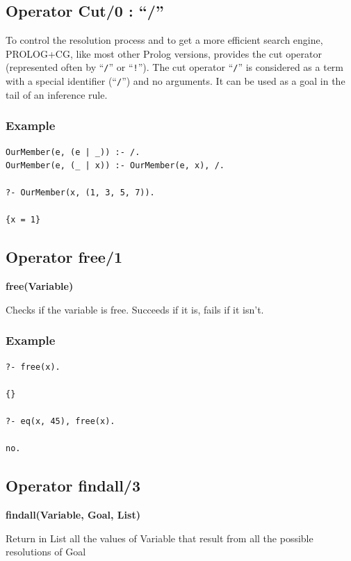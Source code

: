 \documentclass{book}
\begin{document}
\subsection{Operator Cut/0 : ``/''}

To control the resolution process and to get a more efficient search
engine, PROLOG+CG, like most other Prolog versions, provides the cut
operator (represented often by ``\texttt{/}'' or
``\texttt{!}''). The cut operator ``\texttt{/}'' is considered
as a term with a special identifier (``\texttt{/}'') and no
arguments. It can be used as a goal in the tail of an inference rule.

\subsubsection{Example}

\begin{verbatim}
OurMember(e, (e | _)) :- /.
OurMember(e, (_ | x)) :- OurMember(e, x), /.

?- OurMember(x, (1, 3, 5, 7)).

{x = 1}
\end{verbatim}



\subsection{Operator free/1}

{\bf free(Variable)}

Checks if the variable is free.  Succeeds if it is, fails if it isn't.

\subsubsection{Example}


\begin{verbatim}
?- free(x).

{}

?- eq(x, 45), free(x).

no.
\end{verbatim}



\subsection{Operator findall/3}

{\bf findall(Variable, Goal, List)}

Return in List all the values of Variable that result from all the
possible resolutions of Goal
\end{document}
